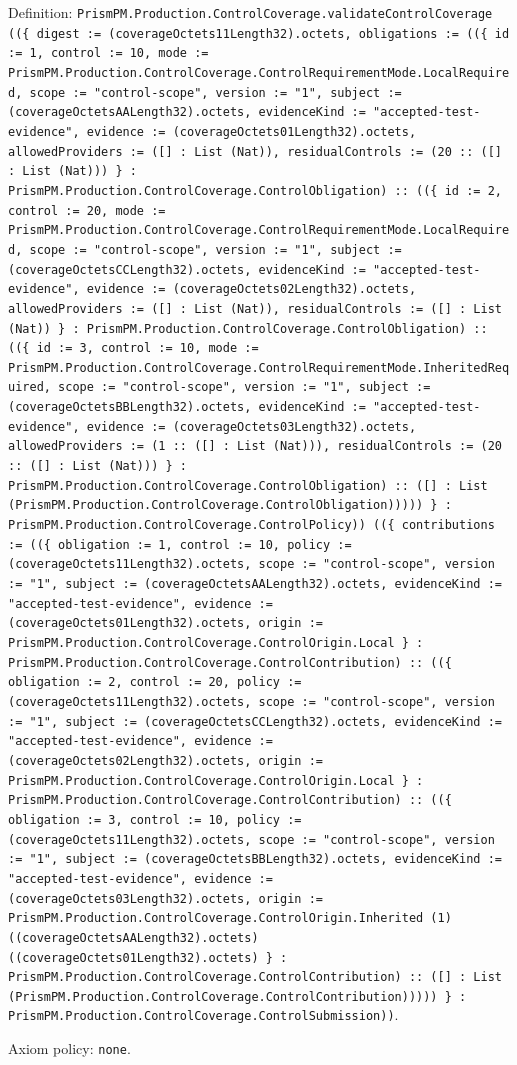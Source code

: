 \documentclass[11pt]{article}
\begin{document}
\noindent Definition: \texttt{PrismPM.Production.ControlCoverage.validateControlCoverage ((\{ digest := (coverageOctets11Length32).octets, obligations := ((\{ id := 1, control := 10, mode := PrismPM.Production.ControlCoverage.ControlRequirementMode.LocalRequired, scope := "control-scope", version := "1", subject := (coverageOctetsAALength32).octets, evidenceKind := "accepted-test-evidence", evidence := (coverageOctets01Length32).octets, allowedProviders := ([] : List (Nat)), residualControls := (20 :: ([] : List (Nat))) \} : PrismPM.Production.ControlCoverage.ControlObligation) :: ((\{ id := 2, control := 20, mode := PrismPM.Production.ControlCoverage.ControlRequirementMode.LocalRequired, scope := "control-scope", version := "1", subject := (coverageOctetsCCLength32).octets, evidenceKind := "accepted-test-evidence", evidence := (coverageOctets02Length32).octets, allowedProviders := ([] : List (Nat)), residualControls := ([] : List (Nat)) \} : PrismPM.Production.ControlCoverage.ControlObligation) :: ((\{ id := 3, control := 10, mode := PrismPM.Production.ControlCoverage.ControlRequirementMode.InheritedRequired, scope := "control-scope", version := "1", subject := (coverageOctetsBBLength32).octets, evidenceKind := "accepted-test-evidence", evidence := (coverageOctets03Length32).octets, allowedProviders := (1 :: ([] : List (Nat))), residualControls := (20 :: ([] : List (Nat))) \} : PrismPM.Production.ControlCoverage.ControlObligation) :: ([] : List (PrismPM.Production.ControlCoverage.ControlObligation))))) \} : PrismPM.Production.ControlCoverage.ControlPolicy)) ((\{ contributions := ((\{ obligation := 1, control := 10, policy := (coverageOctets11Length32).octets, scope := "control-scope", version := "1", subject := (coverageOctetsAALength32).octets, evidenceKind := "accepted-test-evidence", evidence := (coverageOctets01Length32).octets, origin := PrismPM.Production.ControlCoverage.ControlOrigin.Local \} : PrismPM.Production.ControlCoverage.ControlContribution) :: ((\{ obligation := 2, control := 20, policy := (coverageOctets11Length32).octets, scope := "control-scope", version := "1", subject := (coverageOctetsCCLength32).octets, evidenceKind := "accepted-test-evidence", evidence := (coverageOctets02Length32).octets, origin := PrismPM.Production.ControlCoverage.ControlOrigin.Local \} : PrismPM.Production.ControlCoverage.ControlContribution) :: ((\{ obligation := 3, control := 10, policy := (coverageOctets11Length32).octets, scope := "control-scope", version := "1", subject := (coverageOctetsBBLength32).octets, evidenceKind := "accepted-test-evidence", evidence := (coverageOctets03Length32).octets, origin := PrismPM.Production.ControlCoverage.ControlOrigin.Inherited (1) ((coverageOctetsAALength32).octets) ((coverageOctets01Length32).octets) \} : PrismPM.Production.ControlCoverage.ControlContribution) :: ([] : List (PrismPM.Production.ControlCoverage.ControlContribution))))) \} : PrismPM.Production.ControlCoverage.ControlSubmission))}.\par
\noindent Axiom policy: \texttt{none}.\par
\end{document}
